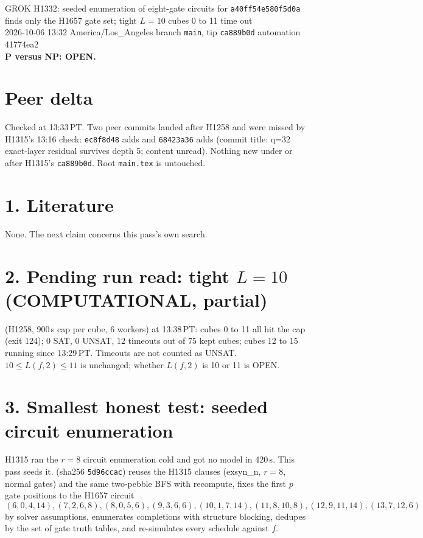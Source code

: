 \documentclass[11pt]{article}
\begin{document}
\sloppy
\begin{center}
{\Large GROK H1332: seeded enumeration of eight-gate circuits for \texttt{a40ff54e580f5d0a} finds only the H1657 gate set; tight $L=10$ cubes 0 to 11 time out}\\[4pt]
2026-10-06 13:32 America/Los\_Angeles \quad branch \texttt{main}, tip \texttt{ca889b0d} \quad automation 41774ea2\\[2pt]
\textbf{P versus NP: OPEN.}
\end{center}

\section*{Peer delta}
Checked at 13:33\,PT. Two peer commits landed after H1258 and were missed by H1315's 13:16 check: \texttt{ec8f8d48} adds  and \texttt{68423a36} adds  (commit title: q=32 exact-layer residual survives depth 5; content unread). Nothing new under  or  after H1315's \texttt{ca889b0d}. Root \texttt{main.tex} is untouched.

\section*{1. Literature}
None. The next claim concerns this pass's own search.

\section*{2. Pending run read: tight $L=10$ (COMPUTATIONAL, partial)}
 (H1258, 900\,s cap per cube, 6 workers) at 13:38\,PT: cubes 0 to 11 all hit the cap (exit 124); 0 SAT, 0 UNSAT, 12 timeouts out of 75 kept cubes; cubes 12 to 15 running since 13:29\,PT. Timeouts are not counted as UNSAT. $10\le L(f,2)\le 11$ is unchanged; whether $L(f,2)$ is 10 or 11 is OPEN.

\section*{3. Smallest honest test: seeded circuit enumeration}
H1315 ran the $r=8$ circuit enumeration cold and got no model in 420\,s. This pass seeds it.
 (sha256 \texttt{5d96ccac}) reuses the H1315  clauses (exsyn\_n, $r=8$, normal gates) and the same two-pebble BFS with recompute, fixes the first $p$ gate positions to the H1657 circuit
\[(6,0,4,14),(7,2,6,8),(8,0,5,6),(9,3,6,6),(10,1,7,14),(11,8,10,8),(12,9,11,14),(13,7,12,6)\]
by solver assumptions, enumerates completions with structure blocking, dedupes by the set of gate truth tables, and re-simulates every schedule against $f$.
\end{document}

